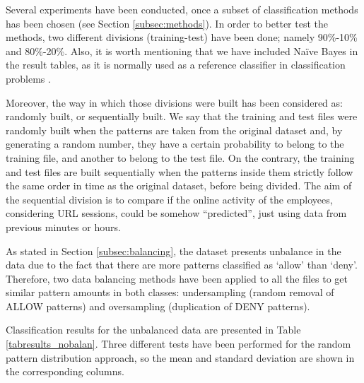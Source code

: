 \documentclass{llncs}
\begin{document}
\noindent Several experiments have been conducted, once a subset of classification methods has been chosen (see Section \ref{subsec:methods}). In order to better test the methods, two different divisions (training-test) have been done; namely 90\%-10\% and 80\%-20\%. Also, it is worth mentioning that we have included Na\"ive Bayes in the result tables, as it is normally used as a reference classifier in classification problems \cite{Frank2011}.

Moreover, the way in which those divisions were built has been considered as: randomly built, or sequentially built. We say that the training and test files were randomly built when the patterns are taken from the original dataset and, by generating a random number, they have a certain probability to belong to the training file, and another to belong to the test file. On the contrary, the training and test files are built sequentially when the patterns inside them strictly follow the same order in time as the original dataset, before being divided. The aim of the sequential division is to compare if the online activity of the employees, considering URL sessions, could be somehow ``predicted'', just using data from previous minutes or hours.

As stated in Section \ref{subsec:balancing}, the dataset presents unbalance in the data due to the fact that there are more patterns classified as `allow' than `deny'. Therefore, two data balancing methods have been applied to all the files to get similar pattern amounts in both classes: undersampling (random removal of ALLOW patterns) and oversampling (duplication of DENY patterns).

Classification results for the unbalanced data are presented in Table \ref{tabresults_nobalan}. Three different tests have been performed for the random pattern distribution approach, so the mean and standard deviation are shown in the corresponding columns.
\end{document}
